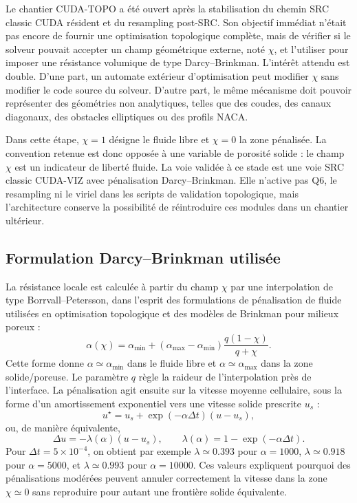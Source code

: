\documentclass[11pt,a4paper]{article}
\begin{document}
Le chantier CUDA-TOPO a été ouvert après la stabilisation du chemin SRC classic CUDA résident et du resampling post-SRC. Son objectif immédiat n'était pas encore de fournir une optimisation topologique complète, mais de vérifier si le solveur pouvait accepter un champ géométrique externe, noté $\chi$, et l'utiliser pour imposer une résistance volumique de type Darcy--Brinkman. L'intérêt attendu est double. D'une part, un automate extérieur d'optimisation peut modifier $\chi$ sans modifier le code source du solveur. D'autre part, le même mécanisme doit pouvoir représenter des géométries non analytiques, telles que des coudes, des canaux diagonaux, des obstacles elliptiques ou des profils NACA.

Dans cette étape, $\chi=1$ désigne le fluide libre et $\chi=0$ la zone pénalisée. La convention retenue est donc opposée à une variable de porosité solide : le champ $\chi$ est un indicateur de liberté fluide. La voie validée à ce stade est une voie SRC classic CUDA-VIZ avec pénalisation Darcy--Brinkman. Elle n'active pas Q6, le resampling ni le viriel dans les scripts de validation topologique, mais l'architecture conserve la possibilité de réintroduire ces modules dans un chantier ultérieur.

\subsection{Formulation Darcy--Brinkman utilisée}

La résistance locale est calculée à partir du champ $\chi$ par une interpolation de type Borrvall--Petersson, dans l'esprit des formulations de pénalisation de fluide utilisées en optimisation topologique et des modèles de Brinkman pour milieux poreux \cite{Brinkman1949,BorrvallPetersson2003} :
\begin{equation}
  \alpha(\chi)=\alpha_{\min}+\left(\alpha_{\max}-\alpha_{\min}\right)\frac{q(1-\chi)}{q+\chi}.
\end{equation}
Cette forme donne $\alpha\simeq \alpha_{\min}$ dans le fluide libre et $\alpha\simeq \alpha_{\max}$ dans la zone solide/poreuse. Le paramètre $q$ règle la raideur de l'interpolation près de l'interface. La pénalisation agit ensuite sur la vitesse moyenne cellulaire, sous la forme d'un amortissement exponentiel vers une vitesse solide prescrite $u_s$ :
\begin{equation}
  u^{\star}=u_s+\exp(-\alpha\Delta t)(u-u_s),
\end{equation}
ou, de manière équivalente,
\begin{equation}
  \Delta u=-\lambda(\alpha)(u-u_s),\qquad
  \lambda(\alpha)=1-\exp(-\alpha\Delta t).
\end{equation}
Pour $\Delta t=5\times10^{-4}$, on obtient par exemple $\lambda\simeq0.393$ pour $\alpha=1000$, $\lambda\simeq0.918$ pour $\alpha=5000$, et $\lambda\simeq0.993$ pour $\alpha=10000$. Ces valeurs expliquent pourquoi des pénalisations modérées peuvent annuler correctement la vitesse dans la zone $\chi\simeq0$ sans reproduire pour autant une frontière solide équivalente.
\end{document}
